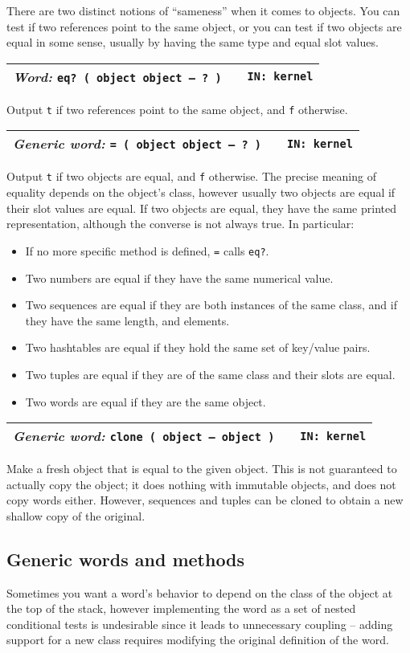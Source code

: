 \documentclass{report}
\newcommand{\ordinaryword}[3]{\index{#1}
\emph{Word:} \texttt{#2} &&\texttt{IN: #3}}
\newcommand{\genericword}[3]{\index{#1}
\emph{Generic word:} \texttt{#2} &&\texttt{IN: #3}}
\newcommand{\wordtable}[1]{

\begin{tabularx}{12cm}[t]{lXr}
\hline
#1\\
\hline
\end{tabularx}

}
\begin{document}
There are two distinct notions of ``sameness'' when it comes to objects. You can test if two references point to the same object, or you can test if two objects are equal in some sense, usually by having the same type and equal slot values.
\wordtable{
\ordinaryword{eq?}{eq?~( object object -- ?~)}{kernel}
}
Output \texttt{t} if two references point to the same object, and \texttt{f} otherwise.
\wordtable{
\genericword{=}{= ( object object -- ?~)}{kernel}
}
Output \texttt{t} if two objects are equal, and \texttt{f} otherwise. The precise meaning of equality depends on the object's class, however usually two objects are equal if their slot values are equal. If two objects are equal, they have the same printed representation, although the converse is not always true. In particular:
\begin{itemize}
\item If no more specific method is defined, \texttt{=} calls \texttt{eq?}.
\item Two numbers are equal if they have the same numerical value.
\item Two sequences are equal if they are both instances of the same class, and if they have the same length, and elements.
\item Two hashtables are equal if they hold the same set of key/value pairs.
\item Two tuples are equal if they are of the same class and their slots are equal.
\item Two words are equal if they are the same object.
\end{itemize}
\wordtable{
\genericword{clone}{clone ( object -- object )}{kernel}
}
Make a fresh object that is equal to the given object. This is not guaranteed to actually copy the object; it does nothing with immutable objects, and does not copy words either. However, sequences and tuples can be cloned to obtain a new shallow copy of the original.

\subsection{Generic words and methods}

Sometimes  you want a word's behavior to depend on the class of the object at the top of the stack, however implementing the word as a set of nested conditional tests is undesirable since it leads to unnecessary coupling -- adding support for a new class requires modifying the original definition of the word.
\end{document}
